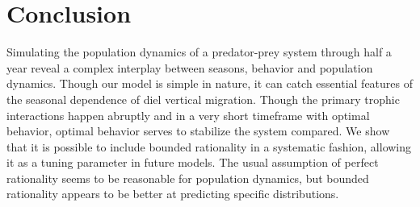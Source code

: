 \section{Conclusion} %
Simulating the population dynamics of a predator-prey system through half a year reveal a complex interplay between seasons, behavior and population dynamics. Though our model is simple in nature, it can catch essential features of the seasonal dependence of diel vertical migration. Though the primary trophic interactions happen abruptly and in a very short timeframe with optimal behavior, optimal behavior serves to stabilize the system compared.
We show that it is possible to include bounded rationality in a systematic fashion, allowing it as a tuning parameter in future models. The usual assumption of perfect rationality seems to be reasonable for population dynamics, but bounded rationality appears to be better at predicting specific distributions.

